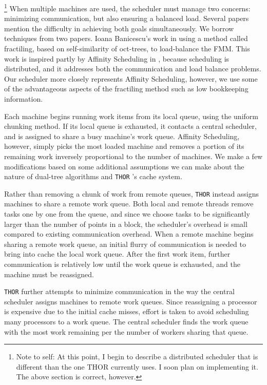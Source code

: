 \documentclass[twoside,leqno,twocolumn]{article}
\newcommand{\THOR}{{{\tt THOR}} }
\newcommand{\authornote}[1]{\footnote{Note to self: #1}}
\newcommand{\authorsnote}[1]{\authornote{#1}}
\begin{document}
\authorsnote{At this point, I begin to describe a distributed scheduler that is different than the one THOR currently uses.
I soon plan on implementing it.  The above section is correct, however.}
When multiple machines are used, the scheduler must manage two concerns: minimizing communication, but also ensuring a balanced load.
Several papers\cite{markatos94using, banicescu, salmon, warren} mention the difficulty in achieving both goals simultaneously.
We borrow techniques from two papers.
Ioana Banicescu's work in \cite{banicescu} using a method called fractiling, based on self-similarity of oct-trees, to load-balance the FMM.
This work is inspired partly by Affinity Scheduling in \cite{markatos94using}, because scheduling is distributed, and it addresses both the communication and load balance problems.
Our scheduler more closely represents Affinity Scheduling, however, we use some of the advantageous aspects of the fractiling method such as low bookkeeping information.

Each machine begins running work items from its local queue, using the uniform chunking method.
If its local queue is exhausted, it contacts a central scheduler, and is assigned to share a busy machine's work queue.
Affinity Scheduling, however, simply picks the most loaded machine and removes a portion of its remaining work inversely proportional to the number of machines.
We make a few modifications based on some additional assumptions we can make about the nature of dual-tree algorithms and \THOR's cache system.

Rather than removing a chunk of work from remote queues, \THOR instead assigns machines to share a remote work queue.
Both local and remote threads remove tasks one by one from the queue, and since we choose tasks to be significantly larger than the number of points in a block, the scheduler's overhead is small compared to existing communication overhead.
When a remote machine begins sharing a remote work queue, an initial flurry of communication is needed to bring into cache the local work queue.
After the first work item, further communication is relatively low until the work queue is exhausted, and the machine must be reassigned.

\THOR further attempts to minimize communication in the way the central scheduler assigns machines to remote work queues.
Since reassigning a processor is expensive due to the initial cache misses, effort is taken to avoid scheduling many processors to a work queue.
The central scheduler finds the work queue with the most work remaining per the number of workers sharing that queue.
\end{document}
